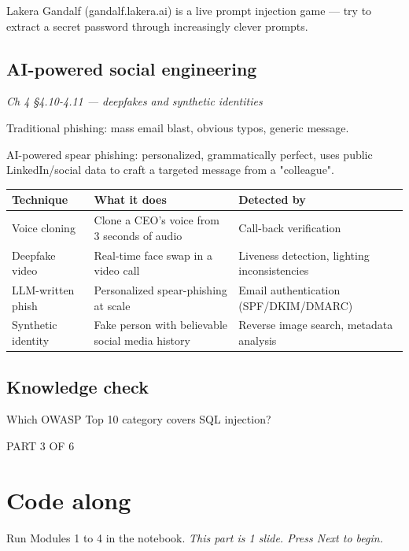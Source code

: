\documentclass[12pt,openany]{book}
\begin{document}
Lakera Gandalf (gandalf.lakera.ai) is a live prompt injection game --- try to extract a secret password through increasingly clever prompts.

\medskip

\subsection*{AI-powered social engineering}
{\small\itshape\color{gray}Ch 4 §4.10-4.11 --- deepfakes and synthetic identities}

Traditional phishing: mass email blast, obvious typos, generic message.


AI-powered spear phishing: personalized, grammatically perfect, uses public LinkedIn/social data to craft a targeted message from a "colleague".


\begin{center}\small\begin{tabular}{p{4.3cm}p{4.3cm}p{4.3cm}}\toprule
\textbf{Technique} & \textbf{What it does} & \textbf{Detected by} \\ \midrule
Voice cloning & Clone a CEO's voice from 3 seconds of audio & Call-back verification \\
Deepfake video & Real-time face swap in a video call & Liveness detection, lighting inconsistencies \\
LLM-written phish & Personalized spear-phishing at scale & Email authentication (SPF/DKIM/DMARC) \\
Synthetic identity & Fake person with believable social media history & Reverse image search, metadata analysis \\
\bottomrule\end{tabular}\end{center}

\medskip

\subsection*{Knowledge check}

Which OWASP Top 10 category covers SQL injection?

\vspace{4pt}\noindent\textsc{PART 3 OF 6}


\section*{Code along}

Run Modules 1 to 4 in the notebook.
{\small\itshape\color{gray}This part is 1 slide. Press Next to begin.}
\end{document}
